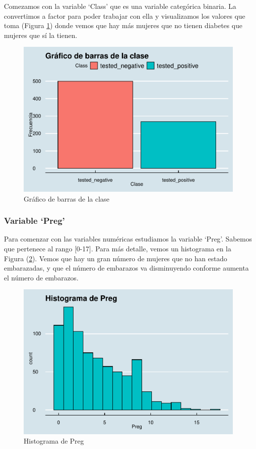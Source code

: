 \documentclass[
]{article}
\begin{document}
Comezamos con la variable `Class' que es una variable categórica
binaria. La convertimos a factor para poder trabajar con ella y
visualizamos los valores que toma (Figura \ref{fig:bar_class}) donde
vemos que hay más mujeres que no tienen diabetes que mujeres que sí la
tienen.

\begin{figure}

{\centering \includegraphics[width=0.5\linewidth]{pima-clasificacion_files/figure-latex/bar_class-1} 

}

\caption{ Gráfico de barras de la clase}\label{fig:bar_class}
\end{figure}

\hypertarget{variable-preg}{%
\subsubsection{Variable `Preg'}\label{variable-preg}}

Para comenzar con las variables numéricas estudiamos la variable `Preg'.
Sabemos que pertenece al rango {[}0-17{]}. Para más detalle, vemos un
histograma en la Figura (\ref{fig:hist_preg}). Vemos que hay un gran
número de mujeres que no han estado embarazadas, y que el número de
embarazos va disminuyendo conforme aumenta el número de embarazos.

\begin{figure}

{\centering \includegraphics[width=0.5\linewidth]{pima-clasificacion_files/figure-latex/hist_preg-1} 

}

\caption{Histograma de Preg}\label{fig:hist_preg}
\end{figure}
\end{document}
